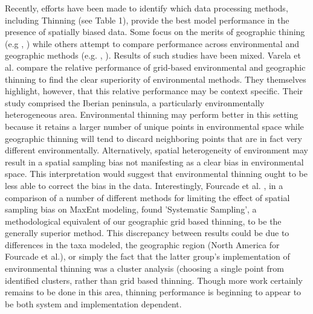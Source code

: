 Recently, eﬀorts have been made to identify which data processing methods, including Thinning (see Table 1), provide the best model performance in the presence of spatially biased data. Some focus on the merits of geographic thining (e.g \cite{Boria:2014fs}, \cite{KramerSchadt:2013br}) while others attempt to compare performance across environmental and geographic methods (e.g. \cite{Varela:2014ck}, \cite{Fourcade:2014ka}). Results of such studies have been mixed. Varela et al. \cite{Varela:2014ck} compare the relative performance of grid-based environmental and geographic thinning to ﬁnd the clear superiority of environmental methods. They themselves highlight, however, that this relative performance may be context speciﬁc. Their study comprised the Iberian peninsula, a particularly environmentally heterogeneous area. Environmental thinning may perform better in this setting because it retains a larger number of unique points in environmental space while geographic thinning will tend to discard neighboring points that are in fact very diﬀerent environmentally. Alternatively, spatial heterogeneity of environment may result in a spatial sampling bias not manifesting as a clear bias in environmental space. This interpretation would suggest that environmental thinning ought to be less able to correct the bias in the data. Interestingly, Fourcade et al. \cite{Fourcade:2014ka}, in a comparison of a number of diﬀerent methods for limiting the eﬀect of spatial sampling bias on MaxEnt modeling, found 'Systematic Sampling', a methodological equivalent of our geographic grid based thinning, to be the generally superior method. This discrepancy between results could be due to diﬀerences in the taxa modeled, the geographic region (North America for Fourcade et al.), or simply the fact that the latter group’s implementation of environmental thinning was a cluster analysis (choosing a single point from identified clusters, rather than grid based thinning. Though more work certainly remains to be done in this area, thinning performance is beginning to appear to be both system and implementation dependent. 

